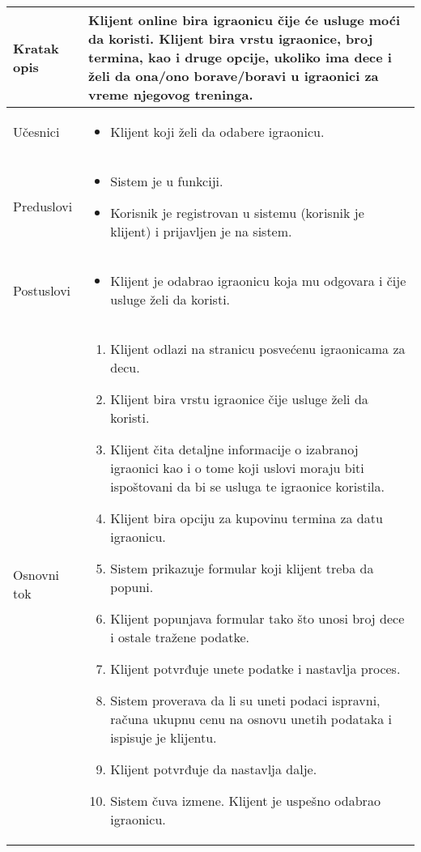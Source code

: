\documentclass[../../main.tex]{subfiles}
\begin{document}
\begin{longtable}{| p{} | p{} |} 
\hline
    Kratak opis & Klijent online bira igraonicu čije će usluge moći da koristi. Klijent bira vrstu igraonice, broj termina, kao i druge opcije, ukoliko ima dece i želi da ona/ono borave/boravi u igraonici za vreme njegovog treninga. \\ 
\hline    
    Učesnici &
    \begin{itemize}
        \item Klijent koji želi da odabere igraonicu.
    \end{itemize}\\
\hline
   Preduslovi &
   \begin{itemize}
        \item Sistem je u funkciji.
        \item Korisnik je registrovan u sistemu (korisnik je klijent) i prijavljen je na sistem.
    \end{itemize}\\
\hline  
    Postuslovi & 
    \begin{itemize}
        \item Klijent je odabrao igraonicu koja mu odgovara i čije usluge želi da koristi.
    \end{itemize} \\
\hline
    Osnovni tok & 
    \begin{enumerate}
        \item Klijent odlazi na stranicu posvećenu igraonicama za decu.
        \item Klijent bira vrstu igraonice čije usluge želi da koristi.
        \item Klijent čita detaljne informacije o izabranoj igraonici kao i o tome koji uslovi moraju biti ispoštovani da bi se usluga te igraonice koristila.
        \item Klijent bira opciju za kupovinu termina za datu igraonicu.
        \item Sistem prikazuje formular koji klijent treba da popuni.
        \item Klijent popunjava formular tako što unosi broj dece i ostale tražene podatke.
        \item Klijent potvrđuje unete podatke i nastavlja proces.
        \item Sistem proverava da li su uneti podaci ispravni, računa ukupnu cenu na osnovu unetih podataka i ispisuje je klijentu.
        \item Klijent potvrđuje da nastavlja dalje. 
        \item Sistem čuva izmene. Klijent je uspešno odabrao igraonicu. %
        

\end{enumerate}
\end{longtable}
\end{document}
